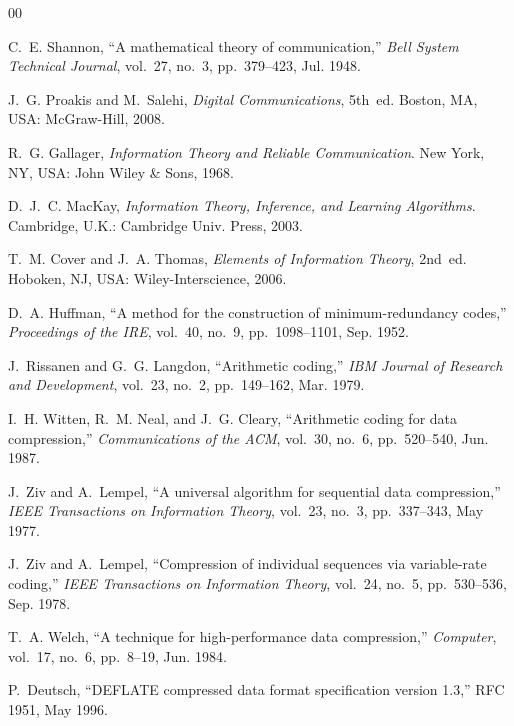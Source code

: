 \documentclass[conference]{IEEEtran}
\begin{document}
\begin{thebibliography}{00}

C.~E. Shannon, ``A mathematical theory of communication,'' \textit{Bell System Technical Journal}, vol.~27, no.~3, pp.~379--423, Jul. 1948.

J.~G. Proakis and M.~Salehi, \textit{Digital Communications}, 5th~ed. Boston, MA, USA: McGraw-Hill, 2008.

R.~G. Gallager, \textit{Information Theory and Reliable Communication}. New York, NY, USA: John Wiley \& Sons, 1968.

D.~J.~C. MacKay, \textit{Information Theory, Inference, and Learning Algorithms}. Cambridge, U.K.: Cambridge Univ. Press, 2003.

T.~M. Cover and J.~A. Thomas, \textit{Elements of Information Theory}, 2nd~ed. Hoboken, NJ, USA: Wiley-Interscience, 2006.

D.~A. Huffman, ``A method for the construction of minimum-redundancy codes,'' \textit{Proceedings of the IRE}, vol.~40, no.~9, pp.~1098--1101, Sep. 1952.

J.~Rissanen and G.~G. Langdon, ``Arithmetic coding,'' \textit{IBM Journal of Research and Development}, vol.~23, no.~2, pp.~149--162, Mar. 1979.

I.~H. Witten, R.~M. Neal, and J.~G. Cleary, ``Arithmetic coding for data compression,'' \textit{Communications of the ACM}, vol.~30, no.~6, pp.~520--540, Jun. 1987.

J.~Ziv and A.~Lempel, ``A universal algorithm for sequential data compression,'' \textit{IEEE Transactions on Information Theory}, vol.~23, no.~3, pp.~337--343, May 1977.

J.~Ziv and A.~Lempel, ``Compression of individual sequences via variable-rate coding,'' \textit{IEEE Transactions on Information Theory}, vol.~24, no.~5, pp.~530--536, Sep. 1978.

T.~A. Welch, ``A technique for high-performance data compression,'' \textit{Computer}, vol.~17, no.~6, pp.~8--19, Jun. 1984.

P.~Deutsch, ``DEFLATE compressed data format specification version 1.3,'' RFC 1951, May 1996.


\end{thebibliography}
\end{document}
